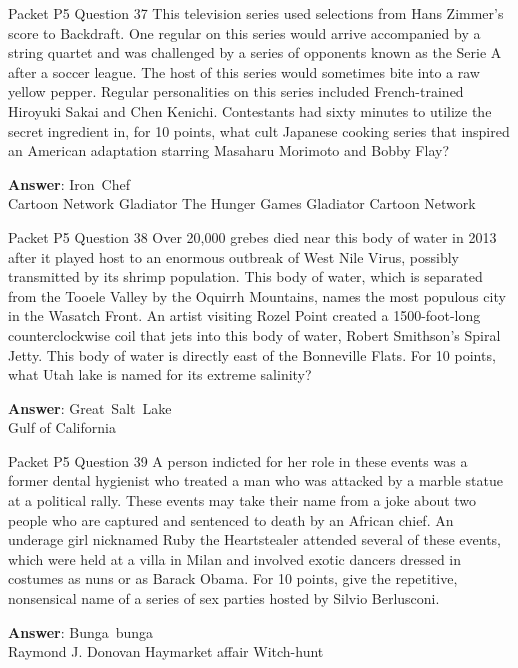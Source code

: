\begin{frame}{Packet P5 Question 37}
This television series   used selections from Hans Zimmer’s score   to Backdraft. One regular on this series would arrive accompanied by a string quartet and was challenged by a series of opponents known as the Serie A after a soccer league. The host of this series would sometimes bite into a raw yellow pepper. Regular personalities on this series included French-trained Hiroyuki Sakai and Chen Kenichi. Contestants had sixty minutes to utilize the secret ingredient in, for 10 points, what cult Japanese cooking series that   inspired an American adaptation starring Masaharu Morimoto and Bobby Flay?      

\textbf{Answer}: Iron\ Chef\\
 Cartoon Network
 Gladiator
 The Hunger Games
 Gladiator
 Cartoon Network
\end{frame}

\begin{frame}{Packet P5 Question 38}
Over 20,000 grebes died near this body of water in 2013 after it played host to an enormous outbreak of West Nile Virus, possibly transmitted by its shrimp population. This body of water, which is separated from the Tooele Valley by the Oquirrh Mountains, names the most populous city in the Wasatch Front.   An artist visiting Rozel Point created   a 1500-foot-long counterclockwise coil that jets into this body of water, Robert Smithson's Spiral Jetty. This body of water is directly east of the Bonneville Flats. For 10 points, what Utah lake   is named for its extreme salinity?  

\textbf{Answer}: Great\ Salt\ Lake\\
 Gulf of California
\end{frame}

\begin{frame}{Packet P5 Question 39}
A person indicted for   her role in these events was a former dental hygienist who treated a man who was attacked by a marble statue at a political rally. These events   may take their name from a joke about two people who are captured and sentenced to death by an African chief. An underage girl nicknamed Ruby the Heartstealer   attended several of these events, which were held at a villa in Milan and involved   exotic dancers dressed in costumes   as nuns or as Barack Obama. For 10 points, give the repetitive, nonsensical name of a series of sex parties hosted by Silvio Berlusconi.  

\textbf{Answer}: Bunga\ bunga\\
 Raymond J. Donovan
 Haymarket affair
 Witch-hunt
\end{frame}

